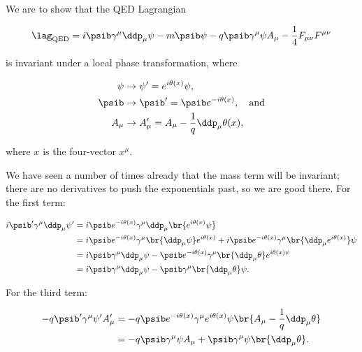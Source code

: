\section{}

We are to show that the QED Lagrangian

\begin{equation}
    \lag_{\mathrm{QED}} = i\psib\gamma^{\mu}\ddp_{\mu}\psi - m\psib\psi - q\psib\gamma^{\mu}\psi A_{\mu} - \frac{1}{4}F_{\mu\nu}F^{\mu\nu}
\end{equation}

is invariant under a local phase transformation, where

\begin{align*}
    \psi &\rightarrow \psi' = e^{i\theta(x)}\psi, \\
    \psib &\rightarrow \psib' = \psib e^{-i\theta(x)}, \quad\mathrm{and} \\
    A_{\mu} &\rightarrow A_{\mu}' = A_{\mu} - \frac{1}{q}\ddp_{\mu}\theta(x),
\end{align*}

where $x$ is the four-vector $x^{\mu}$.

We have seen a number of times already that the mass term will be invariant; there are no derivatives to push the exponentials past, so we are good there. For the first term:

\begin{align*}
    i\psib'\gamma^{\mu}\ddp_{\mu}\psi'
    &= i\psib e^{-i\theta(x)} \gamma^{\mu}\ddp_{\mu} \br{e^{i\theta(x)}\psi} \\
    &= i\psib e^{-i\theta(x)} \gamma^{\mu}\br{\ddp_{\mu}\psi}e^{i\theta(x)} + i\psib e^{-i\theta(x)}\gamma^{\mu}\br{\ddp_{\mu} e^{i\theta(x)}}\psi \\
    &= i\psib \gamma^{\mu}\ddp_{\mu} \psi - \psib e^{-i\theta(x)}\gamma^{\mu}\br{\ddp_{\mu}\theta} e^{i\theta(x)\psi} \\
    &= i\psib \gamma^{\mu}\ddp_{\mu} \psi - \psib \gamma^{\mu} \br{\ddp_{\mu}\theta} \psi.
\end{align*}

For the third term:

\begin{align*}
    -q\psib'\gamma^{\mu}\psi'A_{\mu}'
    &= -q\psib e^{-i\theta(x)}\gamma^{\mu}e^{i\theta(x)}\psi \br{A_{\mu} - \frac{1}{q}\ddp_{\mu}\theta} \\
    &= -q\psib\gamma^{\mu}\psi A_{\mu} + \psib \gamma^{\mu}\psi \br{\ddp_{\mu}\theta}.
\end{align*}

